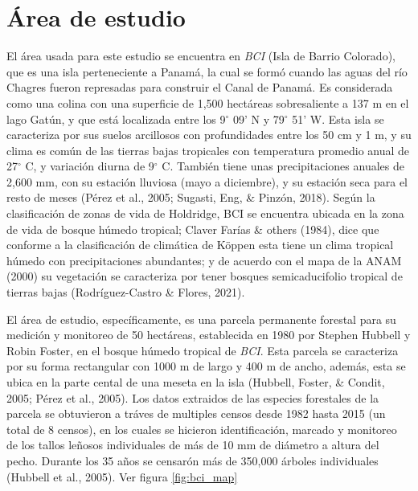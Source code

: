 \documentclass[11pt,]{article}
\begin{document}
\section{Área de estudio}\label{uxe1rea-de-estudio}

El área usada para este estudio se encuentra en \emph{BCI} (Isla de
Barrio Colorado), que es una isla perteneciente a Panamá, la cual se
formó cuando las aguas del río Chagres fueron represadas para construir
el Canal de Panamá. Es considerada como una colina con una superficie de
1,500 hectáreas sobresaliente a 137 m en el lago Gatún, y que está
localizada entre los 9\(^\circ\) 09' N y 79\(^\circ\) 51' W. Esta isla
se caracteriza por sus suelos arcillosos con profundidades entre los 50
cm y 1 m, y su clima es común de las tierras bajas tropicales con
temperatura promedio anual de 27\(^\circ\) C, y variación diurna de
9\(^\circ\) C. También tiene unas precipitaciones anuales de 2,600 mm,
con su estación lluviosa (mayo a diciembre), y su estación seca para el
resto de meses (Pérez et al., 2005; Sugasti, Eng, \& Pinzón, 2018).
Según la clasificación de zonas de vida de Holdridge, BCI se encuentra
ubicada en la zona de vida de bosque húmedo tropical; Claver Farías \&
others (1984), dice que conforme a la clasificación de climática de
Köppen esta tiene un clima tropical húmedo con precipitaciones
abundantes; y de acuerdo con el mapa de la ANAM (2000) su vegetación se
caracteriza por tener bosques semicaducifolio tropical de tierras bajas
(Rodríguez-Castro \& Flores, 2021).

El área de estudio, específicamente, es una parcela permanente forestal
para su medición y monitoreo de 50 hectáreas, establecida en 1980 por
Stephen Hubbell y Robin Foster, en el bosque húmedo tropical de
\emph{BCI}. Esta parcela se caracteriza por su forma rectangular con
1000 m de largo y 400 m de ancho, además, esta se ubica en la parte
cental de una meseta en la isla (Hubbell, Foster, \& Condit, 2005; Pérez
et al., 2005). Los datos extraidos de las especies forestales de la
parcela se obtuvieron a tráves de multiples censos desde 1982 hasta 2015
(un total de 8 censos), en los cuales se hicieron identificación,
marcado y monitoreo de los tallos leñosos individuales de más de 10 mm
de diámetro a altura del pecho. Durante los 35 años se censarón más de
350,000 árboles individuales (Hubbell et al., 2005). Ver figura
\ref{fig:bci_map}
\end{document}
